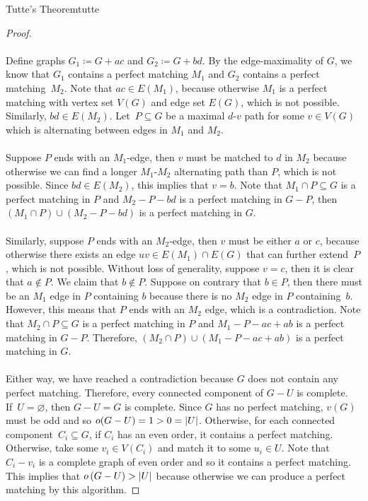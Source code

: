 \documentclass[math]{amznotes}
\theoremstyle{remark}
\newcommand{\0}{\mathbf{0}}
\newcommand{\1}{\mathbf{1}}
\begin{document}
\begin{thmbox}{Tutte's Theorem}{tutte}
\begin{proof}
        \\\\
        Define graphs $G_1 \coloneqq G + ac$ and $G_2 \coloneqq G + bd$. By the edge-maximality of $G$, we know that $G_1$ contains a perfect matching $M_1$ and $G_2$ contains a perfect matching~$M_2$. Note that $ac \in E(M_1)$, because otherwise $M_1$ is a perfect matching with vertex set $V(G)$ and edge set $E(G)$, which is not possible. Similarly, $bd \in E(M_2)$. Let~$P \subseteq G$ be a maximal $d$-$v$ path for some $v \in V(G)$ which is alternating between edges in $M_1$ and $M_2$.
        \\\\
        Suppose $P$ ends with an $M_1$-edge, then $v$ must be matched to $d$ in $M_2$ because otherwise we can find a longer $M_1$-$M_2$ alternating path than $P$, which is not possible. Since $bd \in E(M_2)$, this implies that $v = b$. Note that $M_1 \cap P \subseteq G$ is a perfect matching in $P$ and $M_2 - P - bd$ is a perfect matching in $G - P$, then $(M_1 \cap P) \cup (M_2 - P - bd)$ is a perfect matching in $G$.
        \\\\
        Similarly, suppose $P$ ends with an $M_2$-edge, then $v$ must be either $a$ or $c$, because otherwise there exists an edge $uv \in E(M_1) \cap E(G)$ that can further extend~$P$, which is not possible. Without loss of generality, suppose $v = c$, then it is clear that $a \notin P$. We claim that $b \notin P$. Suppose on contrary that $b \in P$, then there must be an $M_1$ edge in $P$ containing $b$ because there is no $M_2$ edge in $P$ containing~$b$. However, this means that $P$ ends with an $M_2$ edge, which is a contradiction. Note that $M_2 \cap P \subseteq G$ is a perfect matching in $P$ and $M_1 - P - ac + ab$ is a perfect matching in $G - P$. Therefore, $(M_2 \cap P) \cup (M_1 - P - ac + ab)$ is a perfect matching in $G$.
        \\\\
        Either way, we have reached a contradiction because $G$ does not contain any perfect matching. Therefore, every connected component of $G - U$ is complete. If~$U = \varnothing$, then $G - U = G$ is complete. Since $G$ has no perfect matching, $v(G)$ must be odd and so $o(G - U) = 1 > 0 = {\left\lvert {U} \right\rvert}$. Otherwise, for each connected component~$C_i \subseteq G$, if $C_i$ has an even order, it contains a perfect matching. Otherwise, take some $v_i \in V(C_i)$ and match it to some $u_i \in U$. Note that $C_i - v_i$ is a complete graph of even order and so it contains a perfect matching. This implies that $o\left(G - U\right) > {\left\lvert {U} \right\rvert}$ because otherwise we can produce a perfect matching by this algorithm.
    \end{proof}
\end{thmbox}
\end{document}
